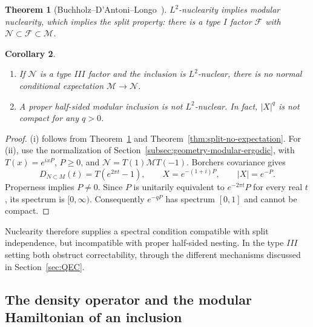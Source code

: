 \documentclass[a4paper,11pt]{article}
\newtheorem{theorem}{Theorem}
\newtheorem{corollary}[theorem]{Corollary}
\theoremstyle{definition}
\begin{document}
\begin{theorem}[Buchholz--D'Antoni--Longo~\cite{BDL1990,BDL2007}]\label{thm:BDL}
$L^2$-nuclearity implies modular nuclearity, which implies the split property: there is a type $I$ factor $\mathcal F$ with $\mathcal N\subset\mathcal F\subset\mathcal M$.
\end{theorem}

\begin{corollary}\label{cor:nuclear-position}
\begin{enumerate}
 \item[\rm(i)] If $\mathcal N$ is a type $III$ factor and the inclusion is $L^2$-nuclear, there is no normal conditional expectation $\mathcal M\to\mathcal N$.
 \item[\rm(ii)] A proper half-sided modular inclusion is not $L^2$-nuclear. In fact, $|X|^q$ is not compact for any $q>0$.
\end{enumerate}
\end{corollary}
\begin{proof}
(i) follows from Theorem~\ref{thm:BDL} and Theorem~\ref{thm:split-no-expectation}. For (ii), use the normalization of Section~\ref{subsec:geometry-modular-ergodic}, with $T(x)=e^{ixP}$, $P\ge0$, and $\mathcal N=T(1)\mathcal M T(-1)$. Borchers covariance gives
\begin{equation}
 D_{N\subset M}(t)=T(e^{2\pi t}-1),
 \qquad X=e^{-(1+i)P},\qquad |X|=e^{-P}.
 \label{eq:inclusion-HSMI-X}
\end{equation}
Properness implies $P\ne0$. Since $P$ is unitarily equivalent to $e^{-2\pi t}P$ for every real $t$, its spectrum is $[0,\infty)$. Consequently $e^{-qP}$ has spectrum $[0,1]$ and cannot be compact.
\end{proof}

Nuclearity therefore supplies a spectral condition compatible with split independence, but incompatible with proper half-sided nesting. In the type $III$ setting both obstruct correctability, through the different mechanisms discussed in Section~\ref{sec:QEC}.

\subsection{The density operator and the modular Hamiltonian of an inclusion}
\end{document}
